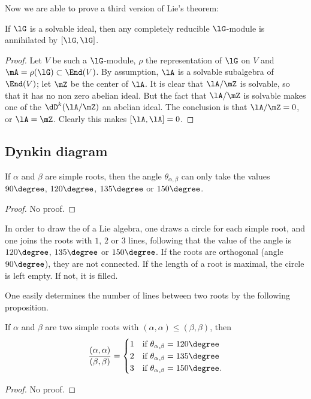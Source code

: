 Now we are able to prove a third version of Lie's theorem:
\begin{theorem}[Lie]\label{tho:Lie_trois}
If $\lG$ is a solvable ideal, then any completely reducible $\lG$-module  is annihilated by $[\lG,\lG]$.
\end{theorem}

\begin{proof}
Let $V$ be such a $\lG$-module, $\rho$ the representation of $\lG$ on $V$ and $\mA=\rho(\lG)\subset\End(V)$. By assumption, $\lA$ is a solvable subalgebra of $\End(V)$; let $\mZ$ be the center of $\lA$. It is clear that $\lA/\mZ$ is solvable, so that it has no non zero abelian ideal. But the fact that $\lA/\mZ$ is solvable makes one of the $\dD^k(\lA/\mZ)$ an abelian ideal. The conclusion is that $\lA/\mZ=0$, or $\lA=\mZ$. Clearly this makes $[\lA,\lA]=0$.
\end{proof}


                    \subsection{Dynkin diagram}

\begin{proposition}
    If $\alpha$ and $\beta$ are simple roots, then the angle $\theta_{\alpha,\beta}$ can only take the values $90\degree$, $120\degree$, $135\degree$ or $150\degree$.
\end{proposition}
\begin{proof}
    No proof.
\end{proof}

In order to draw the  of a Lie algebra, one draws a circle for each simple root, and one joins the roots with $1$, $2$ or $3$ lines, following that the value of the angle is $120\degree$, $135\degree$ or $150\degree$. If the roots are orthogonal (angle $90\degree$), they are not connected. If the length of a root is maximal, the circle is left empty. If not, it is filled.

One easily determines the number of lines between two roots by the following proposition.
\begin{proposition}         \label{PropProdNbLignes}
    If $\alpha$ and $\beta$ are two simple roots with $(\alpha,\alpha)\leq(\beta,\beta)$, then
    \begin{equation}
        \frac{ (\alpha,\alpha) }{ (\beta,\beta) }=
    \begin{cases}
        1   &\text{if }\theta_{\alpha,\beta}=120\degree\\
        2   &\text{if }\theta_{\alpha,\beta}=135\degree\\
        3   &\text{if }\theta_{\alpha,\beta}=150\degree.
    \end{cases}
    \end{equation}
\end{proposition}
\begin{proof}
    No proof.
\end{proof}

